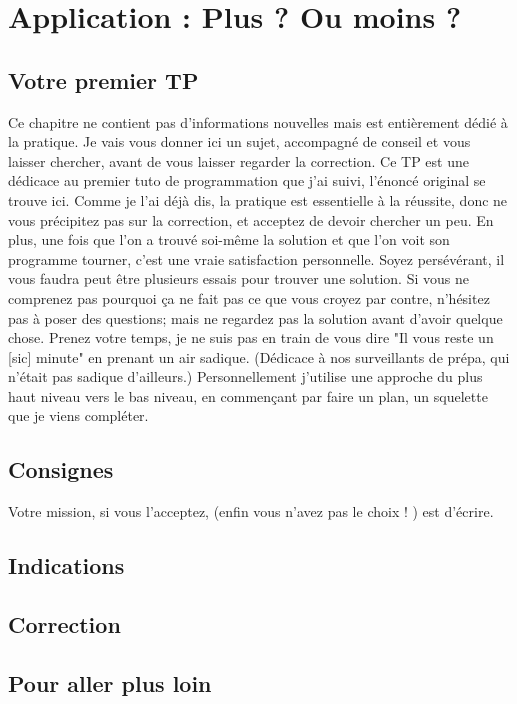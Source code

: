 \chapter{Application : Plus ? Ou moins ?}
\section{Votre premier TP}
Ce chapitre ne contient pas d'informations nouvelles mais est entièrement dédié à la pratique. Je vais vous donner ici un sujet, accompagné de conseil et vous laisser chercher, avant de vous laisser regarder la correction. Ce TP est une dédicace au premier tuto de programmation que j'ai suivi, l'énoncé original se trouve ici.
Comme je l'ai déjà dis, la pratique est essentielle à la réussite, donc ne vous précipitez pas sur la correction, et acceptez de devoir chercher un peu. En plus, une fois que l'on a trouvé soi-même la solution et que l'on voit son programme tourner, c'est une vraie satisfaction personnelle. Soyez persévérant, il vous faudra peut être plusieurs essais pour trouver une solution. Si vous ne comprenez pas pourquoi ça ne fait pas ce que vous croyez par contre, n'hésitez pas à poser des questions; mais ne regardez pas la solution avant d'avoir quelque chose. Prenez votre temps, je ne suis pas en train de vous dire "Il vous reste un [sic] minute" en prenant un air sadique. (Dédicace à nos surveillants de prépa, qui n'était pas sadique d'ailleurs.)
Personnellement j'utilise une approche du plus haut niveau vers le bas niveau, en commençant par faire un plan, un squelette que je viens compléter.
\section{Consignes}
Votre mission, si vous l'acceptez, (enfin vous n'avez pas le choix ! ) est d'écrire.
\section{Indications}
\section{Correction}
\section{Pour aller plus loin}
